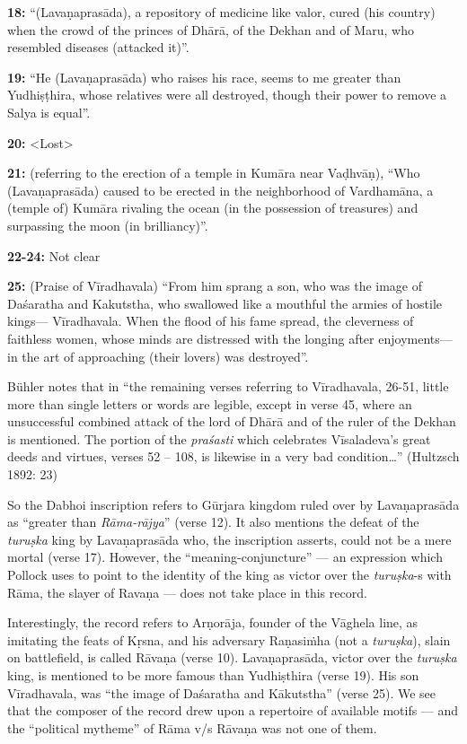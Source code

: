\smallskip
\noindent
{\bf 18:} “(Lavaṇaprasāda), a repository of medicine like valor, cured (his country) when the crowd of the princes of Dhārā, of the Dekhan and of Maru, who resembled diseases (attacked it)”.

\smallskip
\noindent
{\bf  19:} “He (Lavaṇaprasāda) who raises his race, seems to me greater than Yudhiṣṭhira, whose relatives were all destroyed, though their power to remove a Salya is equal”. 

\smallskip
\noindent
{\bf 20:} <Lost>

\smallskip
\noindent
{\bf 21:} (referring to the erection of a temple in Kumāra near Vaḍhvāṇ), “Who (Lavaṇaprasāda) caused to be erected in the neighborhood of Vardhamāna, a (temple of) Kumāra rivaling the ocean (in the possession of treasures) and surpassing the moon (in brilliancy)”.

\smallskip
\noindent
{\bf 22-24:} Not clear

\smallskip
\noindent
{\bf 25:} (Praise of Vīradhavala) “From him sprang a son, who was the image of Daśaratha and Kakutstha, who swallowed like a mouthful the armies of hostile kings— Vīradhavala. When the flood of his fame spread, the cleverness of faithless women, whose minds are distressed with the longing after enjoyments— in the art of approaching (their lovers) was destroyed”. 

\smallskip
Bühler notes that in “the remaining verses referring to Vīradhavala, 26-51, little more than single letters or words are legible, except in verse 45, where an unsuccessful combined attack of the lord of Dhārā and of the ruler of the Dekhan is mentioned. The portion of the {\sl praśasti} which celebrates Vīsaladeva’s great deeds and virtues, verses 52 – 108, is likewise in a very bad condition…” (Hultzsch 1892: 23)

So the Dabhoi inscription refers to Gūrjara kingdom ruled over by Lavaṇaprasāda as “greater than {\sl Rāma-rājya}” (verse 12). It also mentions the defeat of the {\sl turuṣka} king by Lavaṇaprasāda who, the inscription asserts, could not be a mere mortal (verse 17). However, the “meaning-conjuncture” — an expression which Pollock uses to point to the identity of the king as victor over the {\sl turuṣka}-s with Rāma, the slayer of Ravaṇa — does not take place in this record.  

Interestingly, the record refers to Arṇorāja, founder of the Vāghela line, as imitating the feats of Kṛsna, and his adversary Raṇasiṁha (not a {\sl turuṣka}), slain on battlefield, is called Rāvaṇa (verse 10). Lavaṇaprasāda, victor over the {\sl turuṣka} king, is mentioned to be more famous than Yudhiṣthira (verse 19). His son Vīradhavala, was “the image of Daśaratha and Kākutstha” (verse 25). We see that the composer of the record drew upon a repertoire of available motifs — and the “political mytheme” of Rāma v/s Rāvaṇa was not one of them. 


